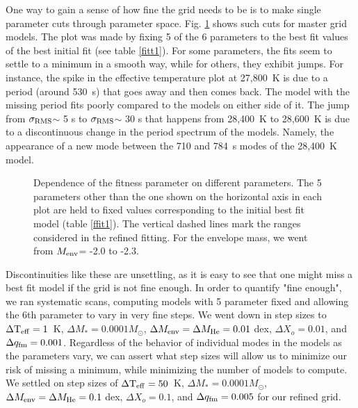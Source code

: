 \documentclass[12pt,preprint]{aastex}
\newcommand{\sigrms}{$\sigma_{\rm RMS}$}
\newcommand{\menv}{$M_{\rm env}$}
\begin{document}
One way to gain a sense of how fine the grid needs to be is to make single 
parameter cuts through parameter space. Fig.  \ref{ffit3} shows such cuts 
for master grid models. The plot was made by fixing 5 of the 6 parameters 
to the best fit values of the best initial fit (see table \ref{fitt1}).
For some parameters, the fits seem to settle to a minimum in a 
smooth way, while for others, they exhibit jumps. For instance, the spike 
in the effective temperature plot at 27,800~K is due to a period (around 530~s) 
that goes away and then comes back. The model with the missing period fits poorly 
compared to the models on either side of it. The jump from \sigrms $\sim$ 5 s 
to \sigrms $\sim$ 30 s that happens from 28,400~K to 28,600~K is due to a discontinuous 
change in the period spectrum of the models. Namely, the appearance of a new mode 
between the 710 and 784~s modes of the 28,400~K model. 

\begin{figure}
\caption{
Dependence of the fitness parameter on different parameters. The 5 parameters other than the one shown 
on the horizontal axis in each plot are held to fixed values corresponding to the initial best fit
model (table \ref{ffit1}). The vertical dashed lines mark the ranges considered in the refined 
fitting. For the envelope mass, we went from \menv = -2.0 to -2.3.
 \label{ffit3}
}
\end{figure}

Discontinuities like these are unsettling, as it is easy to see that one might miss a best fit 
model if the grid is not fine enough. In order to quantify "fine enough", 
we ran systematic scans, computing models with 5 parameter fixed and allowing 
the 6th parameter to vary in very fine steps. We went down in 
step sizes to $\Delta {\rm T_{eff}}=1$~K, $\Delta M_*=0.0001 M_\odot$, 
$\Delta M_{\rm env}= \Delta M_{\rm He}=0.01$ dex, $\Delta X_o=0.01$, and $\Delta q_{\rm fm}=0.001$. 
Regardless of the behavior of individual modes in the models as the parameters vary, 
we can assert what step sizes will allow us to minimize our risk 
of missing a minimum, while minimizing the number of models to compute. We settled on step sizes of 
$\Delta {\rm T_{eff}}=50$~K, $\Delta M_*=0.0001 M_\odot$, $\Delta M_{\rm env}=\Delta M_{\rm He}=0.1$ dex,  
$\Delta X_o=0.1$, and $\Delta q_{\rm fm}=0.005$ for our refined grid.
		
\end{document}
